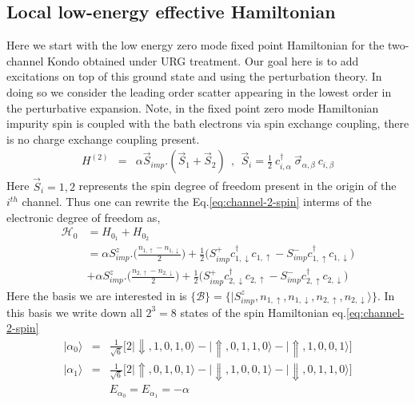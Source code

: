 \documentclass[reprint,prb,superscriptaddress]{revtex4-2}
\begin{document}
\subsection{Local low-energy effective Hamiltonian}
Here we start with the low energy zero mode fixed point Hamiltonian for the two-channel Kondo obtained under URG treatment. Our goal here is to add excitations on top of this ground state and using the perturbation theory. In doing so we consider the leading order scatter appearing in the lowest order in the perturbative expansion. Note, in the fixed point zero mode Hamiltonian impurity spin is coupled with the bath electrons via spin exchange coupling, there is no charge exchange coupling present. 
\begin{eqnarray}
H^{(2)}&=& \alpha \vec{S}_{imp}.(\vec{S}_1+\vec{S}_2)~~,~~\vec{S}_i =  \frac{1}{2}~ c_{i,\alpha}^{\dagger}~ \vec{\sigma}_{\alpha,\beta}~ c_{i,\beta}
\label{eq:channel-2-spin}
\end{eqnarray}
Here $\vec{S}_i=1,2$ represents the spin degree of freedom present in the origin of the $i^{th}$ channel. Thus one can rewrite the Eq.\eqref{eq:channel-2-spin} interms of the electronic degree of freedom as,
\begin{equation}\begin{aligned}
	\mathcal{H}_0 &= H_{0_1}+H_{0_2}\\
		      &= \alpha S^z_{imp}.\bigg(\frac{n_{1,\uparrow}-n_{1,\downarrow}}{2} \bigg) + \frac{1}{2} \bigg( S_{imp}^{+} c^{\dagger}_{1,\downarrow} c_{1,\uparrow} - S_{imp}^{-} c_{1,\uparrow}^{\dagger} c_{1,\downarrow} \bigg)\\
		      &+\alpha S^z_{imp}.\bigg(\frac{n_{2,\uparrow}-n_{2,\downarrow}}{2} \bigg) + \frac{1}{2} \bigg( S_{imp}^{+} c^{\dagger}_{2,\downarrow} c_{2,\uparrow} - S_{imp}^{-} c_{2,\uparrow}^{\dagger} c_{2,\downarrow} \bigg)
\end{aligned}\end{equation}
Here the basis we are interested in is $\{\mathcal{B}\}=\{|S^z_{imp},n_{1,\uparrow},n_{1,\downarrow},n_{2,\uparrow},n_{2,\downarrow}\rangle \}$. In this basis we write down all $2^3=8$ states of the spin Hamiltonian eq.\eqref{eq:channel-2-spin}
\begin{eqnarray}
|\alpha_0\rangle &=& \frac{1}{\sqrt{6}} \bigg[2|\Downarrow,1,0,1,0\rangle-|\Uparrow,0,1,1,0\rangle-|\Uparrow,1,0,0,1\rangle\bigg] \nonumber\\
|\alpha_1\rangle &=& \frac{1}{\sqrt{6}} \bigg[2|\Uparrow,0,1,0,1\rangle-|\Downarrow,1,0,0,1\rangle-|\Downarrow,0,1,1,0\rangle\bigg] \nonumber\\
&& E_{\alpha_0}= E_{\alpha_1}= -\alpha
\end{eqnarray}
\end{document}
